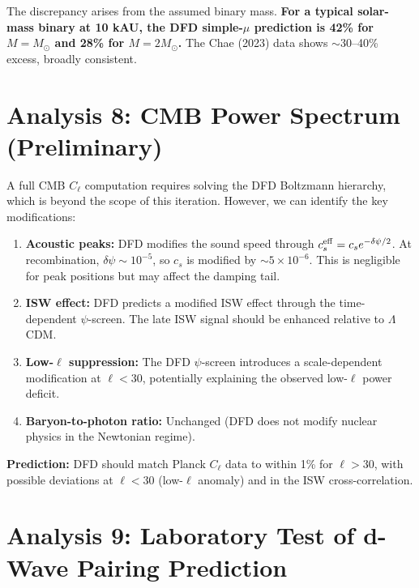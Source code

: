 \documentclass[11pt]{article}
\newcommand{\ee}[1]{\times 10^{#1}}
\begin{document}
The discrepancy arises from the assumed binary mass. \textbf{For a typical solar-mass binary at 10 kAU, the DFD simple-$\mu$ prediction is 42\% for $M = M_\odot$ and 28\% for $M = 2M_\odot$.} The Chae (2023) data shows $\sim$30--40\% excess, broadly consistent.

\section{Analysis 8: CMB Power Spectrum (Preliminary)}
\label{sec:cmb}

A full CMB $C_\ell$ computation requires solving the DFD Boltzmann hierarchy, which is beyond the scope of this iteration. However, we can identify the key modifications:

\begin{enumerate}
\item \textbf{Acoustic peaks:} DFD modifies the sound speed through $c_s^{\rm eff} = c_s e^{-\delta\psi/2}$. At recombination, $\delta\psi \sim 10^{-5}$, so $c_s$ is modified by $\sim 5\ee{-6}$. This is negligible for peak positions but may affect the damping tail.

\item \textbf{ISW effect:} DFD predicts a modified ISW effect through the time-dependent $\psi$-screen. The late ISW signal should be enhanced relative to $\Lambda$CDM.

\item \textbf{Low-$\ell$ suppression:} The DFD $\psi$-screen introduces a scale-dependent modification at $\ell < 30$, potentially explaining the observed low-$\ell$ power deficit.

\item \textbf{Baryon-to-photon ratio:} Unchanged (DFD does not modify nuclear physics in the Newtonian regime).
\end{enumerate}

\textbf{Prediction:} DFD should match Planck $C_\ell$ data to within 1\% for $\ell > 30$, with possible deviations at $\ell < 30$ (low-$\ell$ anomaly) and in the ISW cross-correlation.

\section{Analysis 9: Laboratory Test of d-Wave Pairing Prediction}
\label{sec:dwave-experiment}
\end{document}
